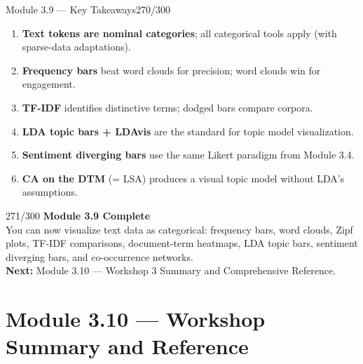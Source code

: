 \documentclass[10pt]{beamer}
\newcommand{\smark}[1]{\hfill{\scriptsize\color{codegray}#1}}
\begin{document}
\begin{frame}{Module 3.9 --- Key Takeaways}\smark{270/300}
\begin{enumerate}
    \item \textbf{Text tokens are nominal categories}; all categorical tools apply (with sparse-data adaptations).
    \item \textbf{Frequency bars} beat word clouds for precision; word clouds win for engagement.
    \item \textbf{TF-IDF} identifies distinctive terms; dodged bars compare corpora.
    \item \textbf{LDA topic bars + LDAvis} are the standard for topic model visualization.
    \item \textbf{Sentiment diverging bars} use the same Likert paradigm from Module 3.4.
    \item \textbf{CA on the DTM} (= LSA) produces a visual topic model without LDA's assumptions.
\end{enumerate}
\end{frame}

\begin{frame}{}\smark{271/300}
\centering\vspace{1.5cm}
{\Large\textbf{Module 3.9 Complete}}\\[0.5cm]
You can now visualize text data as categorical: frequency bars, word clouds, Zipf plots, TF-IDF comparisons, document-term heatmaps, LDA topic bars, sentiment diverging bars, and co-occurrence networks.\\[0.5cm]
\textbf{Next:} Module 3.10 --- Workshop 3 Summary and Comprehensive Reference.
\end{frame}

\section{Module 3.10 --- Workshop Summary and Reference}
\end{document}
